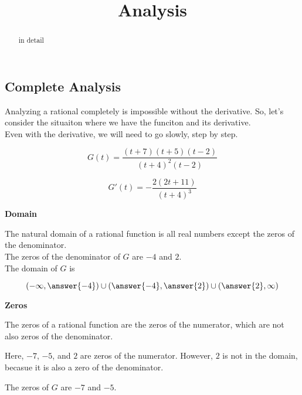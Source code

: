 \documentclass{ximera}
\title{Analysis}
\begin{document}
\begin{abstract}
in detail
\end{abstract}
\maketitle





\subsection*{Complete Analysis}


Analyzing a rational completely is impossible without the derivative. So, let's consider the situaiton where we have the funciton and its derivative. \\

Even with the derivative, we will need to go slowly, step by step.



\[
G(t) = \frac{(t+7)(t+5)(t-2)}{(t+4)^2(t-2)}
\]

\[
G'(t) = -\frac{2(2t+11)}{(t+4)^3}
\]



\textbf{\textcolor{purple!85!blue}{Domain}} \\

\begin{explanation}

The natural domain of a rational function is all real numbers except the zeros of the denominator. \\

The zeros of the denominator of $G$ are $-4$ and $2$. \\


The domain of $G$ is 

\[
\left( -\infty, \answer{-4} \right) \cup \left(\answer{-4}, \answer{2} \right) \cup \left( \answer{2}, \infty \right)
\]


\end{explanation}









\textbf{\textcolor{purple!85!blue}{Zeros}} \\
\begin{explanation}

The zeros of a rational function are the zeros of the numerator, which are not also zeros of the denominator.


Here, $-7$, $-5$, and $2$ are zeros of the numerator.  However, $2$ is not in the domain, becasue it is also a zero of the denominator.


The zeros of $G$ are $-7$ and $-5$.


\end{explanation}
\end{document}

